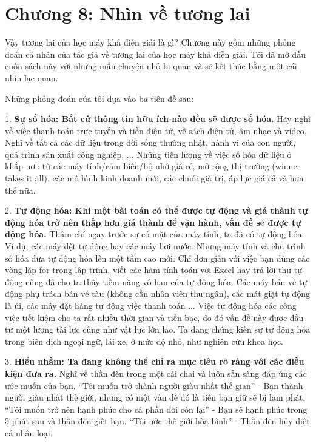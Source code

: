 \chapter*{Chương 8: Nhìn về tương lai}
Vậy tương lai của học máy khả diễn giải là gì? Chương này gồm những phỏng đoán cá nhân của tác giả về tương lai của học máy khả diễn giải. Tôi đã mở đầu cuốn sách này với những \href{}{mẩu chuyện nhỏ} bi quan và sẽ kết thúc bằng một cái nhìn lạc quan.

Những phỏng đoán của tôi dựa vào ba tiên đề sau:

1. \textbf{Sự số hóa: Bất cứ thông tin hữu ích nào đều sẽ được số hóa.} Hãy nghĩ về việc thanh toán trực tuyến và tiền điện tử, về sách điện tử, âm nhạc và video. Nghĩ về tất cả các dữ liệu trong đời sống thường nhật, hành vi của con người, quá trình sản xuất công nghiệp, ... Những tiên lượng về việc số hóa dữ liệu ở khắp nơi: từ các máy tính/cảm biến/bộ nhớ giá rẻ, mở rộng thị trường (winner takes it all), các mô hình kinh doanh mới, các chuỗi giá trị, áp lực giá cả và hơn thế nữa.

2. \textbf{Tự động hóa: Khi một bài toán có thể được tự động và giá thành tự động hóa trở nên thấp hơn giá thành để vận hành, vấn đề sẽ được tự động hóa.} Thậm chí ngay trước sự có mặt của máy tính, ta đã có tự động hóa. Ví dụ, các máy dệt tự động hay các máy hơi nước. Nhưng máy tính và chu trình số hóa đưa tự động hóa lên một tầm cao mới. Chỉ đơn giản với việc bạn dùng các vòng lặp for trong lập trình, viết các hàm tính toán với Excel hay trả lời thư tự động cũng đã cho ta thấy tiềm năng vô hạn của tự động hóa. Các máy bán vé tự động phụ trách bán vé tàu (không cần nhân viên thu ngân), các mát giặt tự động là ủi, các máy đặt hàng tự động việc thanh toán ... Việc tự động hóa các công việc tiết kiệm cho ta rất nhiều thời gian và tiền bạc, do đó vấn đề này được đầu tư một lượng tài lực cũng như vật lực lớn lao. Ta đang chứng kiến sự tự động hóa trong biên dịch ngoại ngữ, lái xe, ở mức độ nhỏ, như nghiên cứu khoa học.

3. \textbf{Hiểu nhầm: Ta đang không thể chỉ ra mục tiêu rõ ràng với các điều kiện đưa ra.} Nghĩ về thần đèn trong một cái chai và luôn sẵn sàng đáp ứng các ước muốn của bạn. ``Tôi muốn trở thành người giàu nhất thế gian'' - Bạn thành người giàu nhất thế giới, nhưng có một vấn đề đó là tiền bạn giữ sẽ bị lạm phát. ``Tôi muốn trở nên hạnh phúc cho cả phần đời còn lại'' - Bạn sẽ hạnh phúc trong 5 phút sau và thần đèn giết bạn. ``Tôi ước thế giới hòa bình'' - Thần đèn hủy diệt cả nhân loại. 

